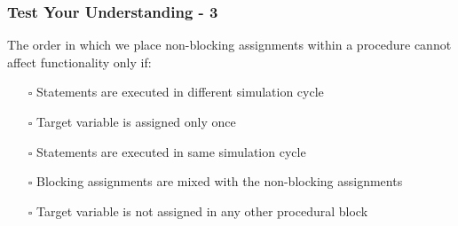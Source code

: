 \documentclass[t, notes, xcolor=table]{beamer}
\begin{document}
\begin{frame}
\frametitle{Test Your Understanding - 3}
The order in which we place non-blocking assignments within a procedure cannot affect functionality only if:
\begin{itemize}
\item[$\square$] Statements are executed in different simulation cycle
\item[$\square$] Target variable is assigned only once
\item[$\square$] Statements are executed in same simulation cycle
\item[$\square$] Blocking assignments are mixed with the non-blocking assignments
\item[$\square$] Target variable is not assigned in any other procedural block
\end{itemize}
\end{frame}
\end{document}
